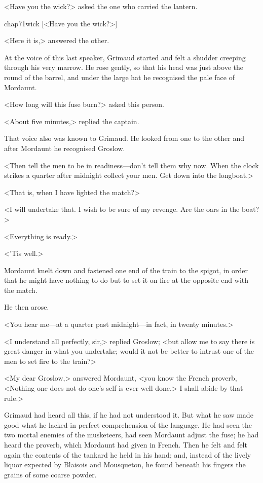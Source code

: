 <Have you the wick?> asked the one who carried the lantern.

\begin{bwbigpic}
	[\basicscale] 
	{chap71wick}
	[<Have you the wick?>]
\end{bwbigpic}

<Here it is,> answered the other.

At the voice of this last speaker, Grimaud started and felt a shudder creeping through his very marrow. He rose gently, so that his head was just above the round of the barrel, and under the large hat he recognised the pale face of Mordaunt.

<How long will this fuse burn?> asked this person.

<About five minutes,> replied the captain.

That voice also was known to Grimaud. He looked from one to the other and after Mordaunt he recognised Groslow.

<Then tell the men to be in readiness—don't tell them why now. When the clock strikes a quarter after midnight collect your men. Get down into the longboat.>

<That is, when I have lighted the match?>

<I will undertake that. I wish to be sure of my revenge. Are the oars in the boat?>

<Everything is ready.>

<'Tis well.>

Mordaunt knelt down and fastened one end of the train to the spigot, in order that he might have nothing to do but to set it on fire at the opposite end with the match.

He then arose.

<You hear me—at a quarter past midnight—in fact, in twenty minutes.>

<I understand all perfectly, sir,> replied Groslow; <but allow me to say there is great danger in what you undertake; would it not be better to intrust one of the men to set fire to the train?>

<My dear Groslow,> answered Mordaunt, <you know the French proverb, <Nothing one does not do one's self is ever well done.> I shall abide by that rule.>

Grimaud had heard all this, if he had not understood it. But what he saw made good what he lacked in perfect comprehension of the language. He had seen the two mortal enemies of the musketeers, had seen Mordaunt adjust the fuse; he had heard the proverb, which Mordaunt had given in French. Then he felt and felt again the contents of the tankard he held in his hand; and, instead of the lively liquor expected by Blaisois and Mousqueton, he found beneath his fingers the grains of some coarse powder.

